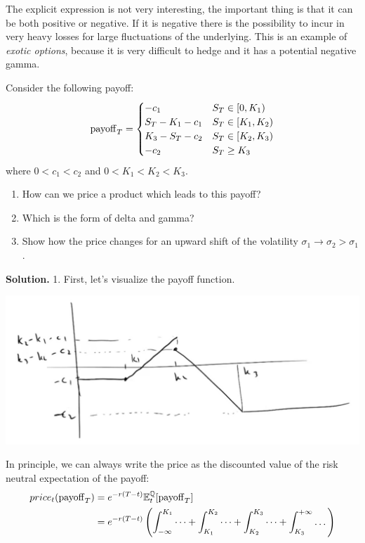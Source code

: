 The explicit expression is not very interesting, the important thing is that it can be both positive or negative. If it is negative there is the possibility to incur in very heavy losses for large fluctuations of the underlying. This is an example of \emph{exotic options}, because it is very difficult to hedge and it has a potential negative gamma.
\begin{example}{}{}{}
    Consider the following payoff:
    \begin{equation}
        \operatorname{payoff}_T = \begin{cases}
        -c_1 & S_T \in [0,K_1) \\
        S_T - K_1 - c_1 & S_T \in [K_1,K_2) \\
        K_3 - S_T - c_2 & S_T \in [K_2,K_3) \\
        -c_2 & S_T \ge K_3
        \end{cases}
    \end{equation}
    where $0<c_1<c_2$ and $0<K_1<K_2<K_3$.
    \begin{enumerate}
        \item How can we price a product which leads to this payoff?
        \item Which is the form of delta and gamma?
        \item Show how the price changes for an upward shift of the volatility $\sigma_1\to\sigma_2>\sigma_1$.
    \end{enumerate}
    \textbf{Solution.} 1. First, let's visualize the payoff function.
    \begin{center}
        \includegraphics[scale=0.3]{fig/tmp/fig28.png}
    \end{center}
    In principle, we can always write the price as the discounted value of the risk neutral expectation of the payoff:
    \begin{align}
        \notag price_t(\pay_T) &= e^{-r(T-t)}\expect_t[\pay_T] \\
        &=
        e^{-r(T-t)}\left(\int_{-\infty}^{K_1}\dots+\int_{K_1}^{K_2}\dots+\int_{K_2}^{K_3}\dots+\int_{K_3}^{+\infty}\dots\right)

\end{align}
\end{example}
